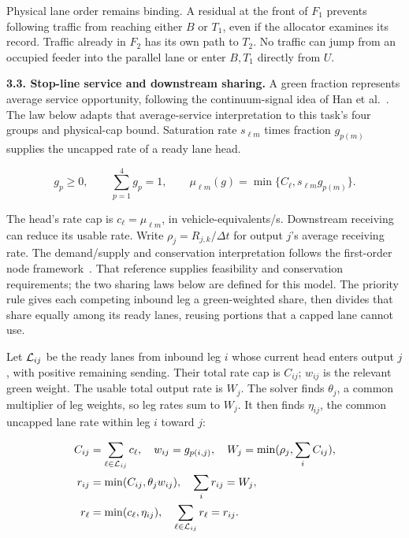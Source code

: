 \documentclass[10pt,a4paper]{article}
\begin{document}
Physical lane order remains binding. A residual at the front of $F_1$
prevents following traffic from reaching either $B$ or $T_1$, even if
the allocator examines its record. Traffic already in $F_2$ has its own
path to $T_2$. No traffic can jump from an occupied feeder into the
parallel lane or enter $B,T_1$ directly from $U$.


\textbf{3.3. Stop-line service and downstream sharing.}
A green fraction represents average service opportunity, following the
continuum-signal idea of Han et al.~\cite{han}.
The law below adapts that average-service interpretation to this task's four groups and physical-cap bound.
Saturation rate $s_{\ell m}$ times fraction $g_{p(m)}$ supplies the
uncapped rate of a ready lane head.
\par
\begin{equation}
 g_p\geq0,\qquad \sum_{p=1}^4g_p=1,\qquad
 \mu_{\ell m}(g)=\min\{C_\ell,s_{\ell m}g_{p(m)}\}.
 \label{eq:compact-action}
\end{equation}

The head's rate cap is $c_\ell=\mu_{\ell m}$, in vehicle-equivalents/s.
Downstream receiving can reduce its usable rate. Write
$\rho_j=R_{j,k}/\Delta t$ for output $j$'s average receiving rate.
The demand/supply and conservation interpretation follows the first-order
node framework~\cite{node}.
That reference supplies feasibility and conservation requirements; the two sharing laws below are defined for this model.
The priority rule gives
each competing inbound leg a green-weighted share, then divides that
share equally among its ready lanes, reusing portions that a capped lane
cannot use.

Let ${\cal L}_{ij}$ be the ready lanes from inbound leg $i$ whose current
head enters output $j$, with positive remaining sending. Their total rate
cap is $C_{ij}$; $w_{ij}$ is the relevant green weight. The usable total
output rate is $W_j$. The solver finds $\theta_j$, a common multiplier of
leg weights, so leg rates sum to $W_j$. It then finds $\eta_{ij}$, the
common uncapped lane rate within leg $i$ toward $j$:
\par
\begin{align}
 C_{ij}&=\sum_{\ell\in{\cal L}_{ij}}c_\ell,\quad
 w_{ij}=g_{p(i,j)},\quad W_j=\min(\rho_j,\sum_iC_{ij}),\nonumber\\
 r_{ij}&=\min(C_{ij},\theta_jw_{ij}),\quad
                    \sum_i r_{ij}=W_j,\label{eq:compact-leg-sharing}\\
 r_\ell&=\min(c_\ell,\eta_{ij}),\quad
                    \sum_{\ell\in{\cal L}_{ij}}r_\ell=r_{ij}.
 \label{eq:compact-lane-sharing}
\end{align}
\end{document}
